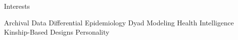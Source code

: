 \begin{rSection}{\textrm{Interests}} \begin{center}Archival Data \bigcdot Differential Epidemiology \bigcdot Dyad Modeling \bigcdot Health \bigcdot Intelligence \bigcdot Kinship-Based Designs \bigcdot Personality\end{center}
\end{rSection}